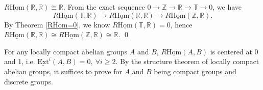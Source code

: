 \documentclass[UTF8,12,a4paper]{ctexart}
\theoremstyle{definition}
\begin{document}
\cor 
$R\underline{\text{Hom}}(\mathbb{R},\mathbb{R})\cong \mathbb{R}.$
\pf 
From the exact sequence $0\to \mathbb{Z}\to \mathbb{R}\to \mathbb{T}\to 0$, we have 
$$R\underline{\text{Hom}}(\mathbb{T},\mathbb{R})\rightarrow R\underline{\text{Hom}}(\mathbb{R},\mathbb{R})\rightarrow R\underline{\text{Hom}}(\mathbb{Z},\mathbb{R}).$$
By Theorem \ref{RHom=0}, we know $R\underline{\text{Hom}}(\mathbb{T},\mathbb{R})=0$, hence $R\underline{\text{Hom}}(\mathbb{R},\mathbb{R})\cong R\underline{\text{Hom}}(\mathbb{Z},\mathbb{R})\cong \mathbb{R}.$
\qed

\cor \label{concentrated at 0,1}
For any locally compact abelian groups $A$ and $B$, $R\underline{\text{Hom}}(A,B)$ is centered at 0 and 1, i.e. $\underline{\text{Ext}}^i(A,B)=0,\ \forall i\geq 2.$
\pf 
By the structure theorem of locally compact abelian groups, it suffices to prove for $A$ and $B$ being compact groups and discrete groups.
\end{document}
